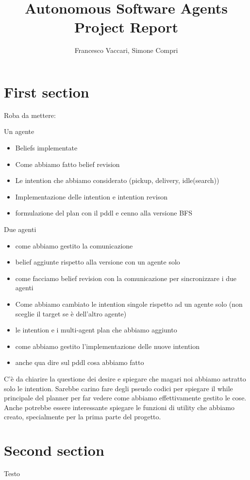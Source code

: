 \documentclass[a4paper, 11pt]{article}
\title{Autonomous Software Agents \\ \large{Project Report} }
\author{Francesco Vaccari, Simone Compri}
\begin{document}
\maketitle
\tableofcontents










\section{First section}

Roba da mettere:

Un agente
\begin{itemize}
\item Beliefs implementate
\item Come abbiamo fatto belief revision
\item Le intention che abbiamo considerato (pickup, delivery, idle(search))
\item Implementazione delle intention e intention revison
\item formulazione del plan con il pddl e cenno alla versione BFS
\end{itemize}

Due agenti
\begin{itemize}
\item come abbiamo gestito la comunicazione
\item belief aggiunte rispetto alla versione con un agente solo
\item come facciamo belief revision con la comunicazione per sincronizzare i due agenti
\item Come abbiamo cambiato le intention singole rispetto ad un agente solo (non sceglie il target se è dell'altro agente)
\item le intention e i multi-agent plan che abbiamo aggiunto
\item come abbiamo gestito l'implementazione delle nuove intention
\item anche qua dire sul pddl cosa abbiamo fatto
\end{itemize}

C'è da chiarire la questione dei desire e spiegare che magari noi abbiamo astratto solo le intention. Sarebbe carino fare degli pseudo codici per spiegare il while principale del planner per far vedere come abbiamo effettivamente gestito le cose. Anche potrebbe essere interessante spiegare le funzioni di utility che abbiamo creato, specialmente per la prima parte del progetto.









\pagebreak

\section{Second section}

Testo

\pagebreak


\end{document}
